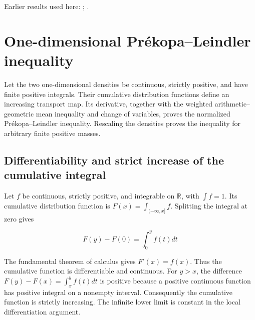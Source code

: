 \documentclass[11pt,a4paper]{report}
\begin{document}
Earlier results used here: \cite[Section~3.26.13]{LangevinLean2026ULASC}; \cite[Section~3.26.15]{LangevinLean2026ULASC}.
\section{\texorpdfstring{One-dimensional Prékopa–Leindler inequality}{One-dimensional Prékopa–Leindler inequality}}
\label{proof-module-IPLA-PrekopaLeindler-lean}


Let the two one-dimensional densities be continuous, strictly positive, and have finite positive integrals. Their cumulative distribution functions define an increasing transport map. Its derivative, together with the weighted arithmetic–geometric mean inequality and change of variables, proves the normalized Prékopa–Leindler inequality. Rescaling the densities proves the inequality for arbitrary finite positive masses.

\subsection{\texorpdfstring{Differentiability and strict increase of the cumulative integral}{Differentiability and strict increase of the cumulative integral}}
\label{report-step-IPLA-PrekopaLeindler-lean-1}


Let \(f\) be continuous, strictly positive, and integrable on \(\mathbb R\), with \(\int f=1\). Its cumulative distribution function is \(F(x)=\int_{(-\infty,x]}f\). Splitting the integral at zero gives

\[F(y)-F(0)=\int_0^y f(t)dt\]

The fundamental theorem of calculus gives \(F'(x)=f(x)\). Thus the cumulative function is differentiable and continuous. For \(y>x\), the difference \(F(y)-F(x)=\int_x^y f(t)dt\) is positive because a positive continuous function has positive integral on a nonempty interval. Consequently the cumulative function is strictly increasing. The infinite lower limit is constant in the local differentiation argument.
\end{document}

